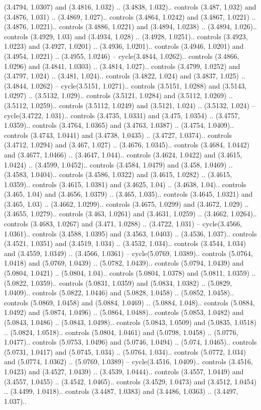 (3.4794, 1.0307) and (3.4816, 1.032) .. (3.4838, 1.032).. controls (3.487, 1.032) and (3.4876, 1.031) .. (3.4869, 1.027).. controls (3.4864, 1.0242) and (3.4867, 1.0221) .. (3.4876, 1.0221).. controls (3.4886, 1.0221) and (3.4894, 1.0238) .. (3.4894, 1.026).. controls (3.4929, 1.03) and (3.4934, 1.028) .. (3.4928, 1.0251).. controls (3.4923, 1.0223) and (3.4927, 1.0201) .. (3.4936, 1.0201).. controls (3.4946, 1.0201) and (3.4954, 1.0221) .. (3.4955, 1.0246) -- cycle(3.4844, 1.0262).. controls (3.4866, 1.0296) and (3.4841, 1.0303) .. (3.4814, 1.027).. controls (3.4799, 1.0252) and (3.4797, 1.024) .. (3.481, 1.024).. controls (3.4822, 1.024) and (3.4837, 1.025) .. (3.4844, 1.0262) -- cycle(3.5151, 1.0271).. controls (3.5151, 1.0288) and (3.5143, 1.0297) .. (3.5132, 1.029).. controls (3.5121, 1.0284) and (3.5112, 1.0269) .. (3.5112, 1.0259).. controls (3.5112, 1.0249) and (3.5121, 1.024) .. (3.5132, 1.024) -- cycle(3.4722, 1.031).. controls (3.4735, 1.0331) and (3.475, 1.0354) .. (3.4757, 1.0359).. controls (3.4764, 1.0365) and (3.4763, 1.0387) .. (3.4754, 1.0409).. controls (3.4743, 1.0441) and (3.4738, 1.0435) .. (3.4727, 1.0374).. controls (3.4712, 1.0294) and (3.467, 1.027) .. (3.4676, 1.0345).. controls (3.4684, 1.0442) and (3.4677, 1.0466) .. (3.4647, 1.044).. controls (3.4624, 1.0422) and (3.4615, 1.0424) .. (3.4599, 1.0452).. controls (3.4584, 1.0479) and (3.458, 1.0469) .. (3.4583, 1.0404).. controls (3.4586, 1.0322) and (3.4615, 1.0282) .. (3.4615, 1.0359).. controls (3.4615, 1.0381) and (3.4625, 1.04) .. (3.4638, 1.04).. controls (3.465, 1.04) and (3.4656, 1.0379) .. (3.465, 1.035).. controls (3.4645, 1.0321) and (3.465, 1.03) .. (3.4662, 1.0299).. controls (3.4675, 1.0299) and (3.4672, 1.029) .. (3.4655, 1.0279).. controls (3.463, 1.0261) and (3.4631, 1.0259) .. (3.4662, 1.0264).. controls (3.4683, 1.0267) and (3.471, 1.0288) .. (3.4722, 1.031) -- cycle(3.4566, 1.0361).. controls (3.4588, 1.0395) and (3.4563, 1.0403) .. (3.4536, 1.037).. controls (3.4521, 1.0351) and (3.4519, 1.034) .. (3.4532, 1.034).. controls (3.4544, 1.034) and (3.4559, 1.0349) .. (3.4566, 1.0361) -- cycle(5.0769, 1.0389).. controls (5.0764, 1.0418) and (5.0769, 1.0439) .. (5.0782, 1.0439).. controls (5.0794, 1.0439) and (5.0804, 1.0421) .. (5.0804, 1.04).. controls (5.0804, 1.0378) and (5.0811, 1.0359) .. (5.0822, 1.0359).. controls (5.0831, 1.0359) and (5.0834, 1.0382) .. (5.0829, 1.0409).. controls (5.0822, 1.0446) and (5.0828, 1.0458) .. (5.0852, 1.0458).. controls (5.0869, 1.0458) and (5.0884, 1.0469) .. (5.0884, 1.048).. controls (5.0884, 1.0492) and (5.0874, 1.0496) .. (5.0864, 1.0488).. controls (5.0853, 1.0482) and (5.0843, 1.0486) .. (5.0843, 1.0498).. controls (5.0843, 1.0509) and (5.0835, 1.0518) .. (5.0824, 1.0518).. controls (5.0804, 1.0461) and (5.0798, 1.0458) .. (5.0776, 1.0477).. controls (5.0753, 1.0496) and (5.0746, 1.0494) .. (5.074, 1.0465).. controls (5.0731, 1.0417) and (5.0745, 1.034) .. (5.0764, 1.034).. controls (5.0772, 1.034) and (5.0774, 1.0362) .. (5.0769, 1.0389) -- cycle(3.4516, 1.0409).. controls (3.4516, 1.0423) and (3.4527, 1.0439) .. (3.4539, 1.0444).. controls (3.4557, 1.0449) and (3.4557, 1.0455) .. (3.4542, 1.0465).. controls (3.4529, 1.0473) and (3.4512, 1.0454) .. (3.4499, 1.0418).. controls (3.4487, 1.0383) and (3.4486, 1.0363) .. (3.4497, 1.037).. 